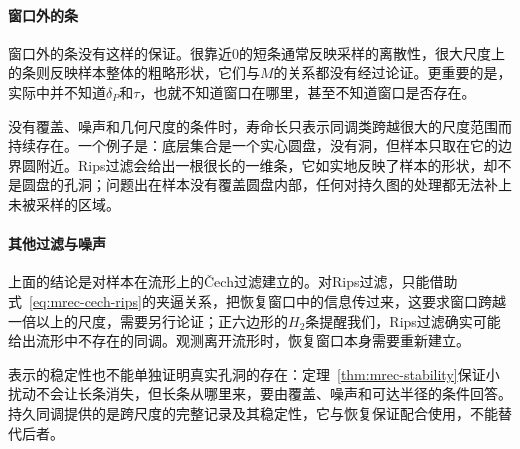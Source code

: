 \paragraph{窗口外的条}

窗口外的条没有这样的保证。很靠近$0$的短条通常反映采样的离散性，很大尺度上的条则反映样本整体的粗略形状，它们与$M$的关系都没有经过论证。更重要的是，实际中并不知道$\delta_P$和$\tau$，也就不知道窗口在哪里，甚至不知道窗口是否存在。

没有覆盖、噪声和几何尺度的条件时，寿命长只表示同调类跨越很大的尺度范围而持续存在。一个例子是：底层集合是一个实心圆盘，没有洞，但样本只取在它的边界圆附近。Rips过滤会给出一根很长的一维条，它如实地反映了样本的形状，却不是圆盘的孔洞；问题出在样本没有覆盖圆盘内部，任何对持久图的处理都无法补上未被采样的区域。

\paragraph{其他过滤与噪声}

上面的结论是对样本在流形上的Čech过滤建立的。对Rips过滤，只能借助式~\eqref{eq:mrec-cech-rips}的夹逼关系，把恢复窗口中的信息传过来，这要求窗口跨越一倍以上的尺度，需要另行论证；正六边形的$H_2$条提醒我们，Rips过滤确实可能给出流形中不存在的同调。观测离开流形时，恢复窗口本身需要重新建立。

表示的稳定性也不能单独证明真实孔洞的存在：定理~\ref{thm:mrec-stability}保证小扰动不会让长条消失，但长条从哪里来，要由覆盖、噪声和可达半径的条件回答。持久同调提供的是跨尺度的完整记录及其稳定性，它与恢复保证配合使用，不能替代后者。
